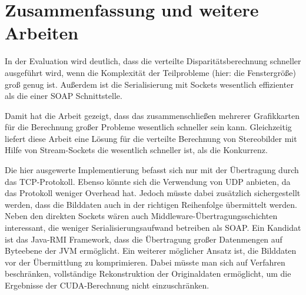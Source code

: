 \documentclass[conference]{IEEEtran}
\begin{document}




\section{Zusammenfassung und weitere Arbeiten}
In der Evaluation wird deutlich, dass die verteilte Disparitätsberechnung schneller ausgeführt wird, wenn die Komplexität der Teilprobleme (hier: die Fenstergröße) groß genug ist. Außerdem ist die Serialisierung mit Sockets wesentlich effizienter als die einer SOAP Schnittstelle.

Damit hat die Arbeit gezeigt, dass das zusammenschließen mehrerer Grafikkarten für die Berechnung großer Probleme wesentlich schneller sein kann. Gleichzeitig liefert diese Arbeit eine Lösung für die verteilte Berechnung von Stereobilder mit Hilfe von Stream-Sockets die wesentlich schneller ist, als die Konkurrenz. %


Die hier ausgewerte Implementierung befasst sich nur mit der Übertragung durch das TCP-Protokoll. Ebenso könnte sich die Verwendung von UDP anbieten, da das Protokoll weniger Overhead hat. Jedoch müsste dabei zusätzlich sichergestellt werden, dass die Bilddaten auch in der richtigen Reihenfolge übermittelt werden.
Neben den direkten Sockets wären auch Middleware-Übertragungsschichten interessant, die weniger Serialisierungsaufwand betreiben als SOAP. Ein Kandidat ist das Java-RMI Framework, dass die Übertragung großer Datenmengen auf Byteebene der JVM ermöglicht.
Ein weiterer möglicher Ansatz ist, die Bilddaten vor der Übermittlung zu komprimieren. Dabei müsste man sich auf Verfahren beschränken, vollständige Rekonstruktion der Originaldaten ermöglicht, um die Ergebnisse der CUDA-Berechnung nicht einzuschränken. 
\end{document}
